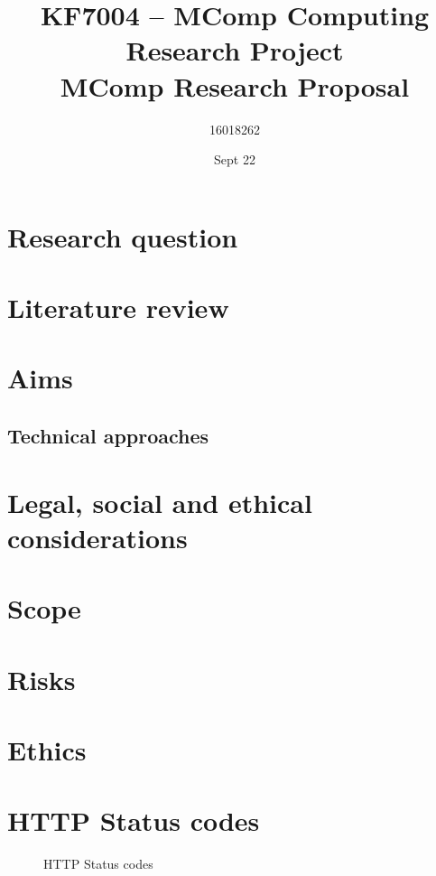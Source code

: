 \documentclass[10pt]{article}
\title{KF7004 – MComp Computing Research Project \\ MComp Research Proposal}
\author{16018262}
\date{Sept 22}
\begin{document}
\maketitle
\begin{center}
\end{center}
\tableofcontents
\section{Research question}

\section{Literature review}

\section{Aims}

\subsection{Technical approaches}

\section{Legal, social and ethical considerations}

\section{Scope}

\section{Risks}


\printbibliography
\appendix
\section{Ethics} \label{ethics}
%
\newpage
\section{HTTP Status codes} \label{codes}
\vspace{5mm} %
\begin{figure}[] \label{HTTP Status codes}
    \centering
    \caption{HTTP Status codes}
    \label{fig:my_label}
\end{figure}
\end{document}
